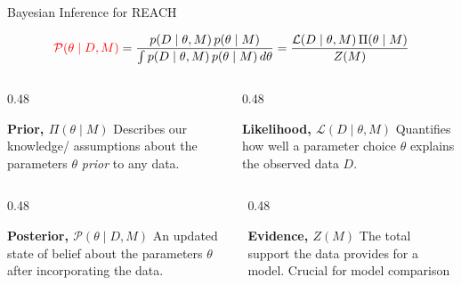 \documentclass{beamer}
\begin{document}
\begin{frame}{Bayesian Inference for REACH}

\centering
\vspace{-2em}
\begingroup
\color{black}
\[
\textcolor{red}{\mathcal{P}(\theta \mid D, M)}
=
\frac{p(D \mid \theta, M)\, p(\theta \mid M)}{
\int p(D \mid \theta, M)\, p(\theta \mid M)\, d\theta
}
=
\frac{\mathcal{L}(D \mid \theta, M)\, \Pi(\theta \mid M)}{Z(M)}
\]
\endgroup

\small
\begin{columns}[T,totalwidth=\textwidth]

\begin{column}{0.48\textwidth}
\begin{block}{\textbf{Prior, $\Pi(\theta \mid M)$}}
Describes our knowledge/ assumptions about the parameters  
\(\theta\) \textit{prior} to any data.
\end{block}
\end{column}

\begin{column}{0.48\textwidth}
\begin{block}{\textbf{Likelihood, $\mathcal{L}(D \mid \theta, M)$}}
Quantifies how well a parameter choice \(\theta\) explains  
the observed data \(D\).
\end{block}
\end{column}

\end{columns}

\vspace{0.7em}

\begin{columns}[T,totalwidth=\textwidth]

\begin{column}{0.48\textwidth}
{

\begin{block}{\textbf{Posterior, $\mathcal{P}(\theta \mid D, M)$}}
An updated state of belief about the parameters \(\theta\) after incorporating the data.
\end{block}

}
\end{column}

\begin{column}{0.48\textwidth}
\begin{block}{\textbf{Evidence, $Z(M)$}}
The total support the data provides for a model. Crucial for model comparison
\end{block}
\end{column}

\end{columns}
\end{frame}
\end{document}
